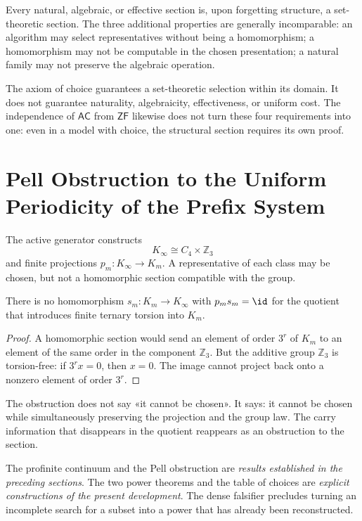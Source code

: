 Every natural, algebraic, or effective section is, upon forgetting structure, a
set-theoretic section. The three additional properties are generally
incomparable: an algorithm may select representatives without being a homomorphism;
a homomorphism may not be computable in the chosen presentation; a
natural family may not preserve the algebraic operation.

\begin{remark}
The axiom of choice guarantees a set-theoretic selection within its
domain. It does not guarantee naturality, algebraicity, effectiveness, or uniform
cost. The independence of \(\mathsf{AC}\) from \(\mathsf{ZF}\)
likewise does not turn these four requirements into one: even in a model
with choice, the structural section requires its own proof.
\end{remark}

\section{Pell Obstruction to the Uniform Periodicity of the Prefix System}

The active generator constructs
\[
  K_\infty\cong C_4\times\mathbb Z_3
\]
and finite projections \(p_m:K_\infty\to K_m\). A
representative of each class may be chosen, but not a homomorphic section compatible with the
group.

\begin{proposition}
There is no homomorphism \(s_m:K_m\to K_\infty\) with
\(p_ms_m=\id\) for the quotient that introduces finite ternary torsion into
\(K_m\).
\end{proposition}

\begin{proof}
A homomorphic section would send an element of order \(3^r\) of \(K_m\) to an
element of the same order in the component \(\mathbb Z_3\). But the additive group
\(\mathbb Z_3\) is torsion-free: if \(3^rx=0\), then \(x=0\).
The image cannot project back onto a nonzero element of order
\(3^r\).
\end{proof}

The obstruction does not say «it cannot be chosen». It says: it cannot be chosen
while simultaneously preserving the projection and the group law. The carry
information that disappears in the quotient reappears as an obstruction to the section.

\begin{remark}
The profinite continuum and the Pell obstruction are
\emph{results established in the preceding sections}. The two power theorems and the table of
choices are \emph{explicit constructions of the present development}. The dense falsifier precludes
turning an incomplete search for a subset into a power that has already been
reconstructed.
\end{remark}
